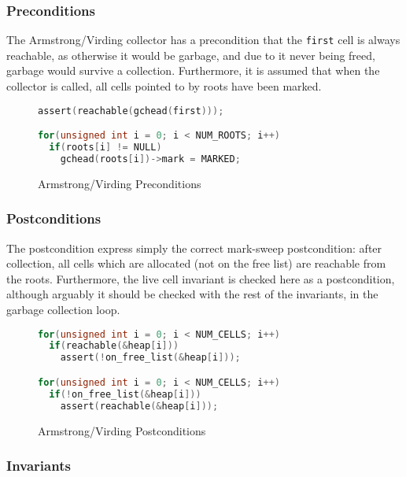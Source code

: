 \subsubsection{Preconditions}
\label{sec:results-impl-ms-pre}

The Armstrong/Virding collector has a precondition that the
\texttt{first} cell is always reachable, as otherwise it would be
garbage, and due to it never being freed, garbage would survive a
collection. Furthermore, it is assumed that when the collector is
called, all cells pointed to by roots have been marked.

\begin{figure}[H]
  \begin{lstlisting}[language=C]
assert(reachable(gchead(first)));

for(unsigned int i = 0; i < NUM_ROOTS; i++)
  if(roots[i] != NULL)
    gchead(roots[i])->mark = MARKED;
  \end{lstlisting}
  \captionsetup{format=default}
  \caption{Armstrong/Virding Preconditions}
\end{figure}

\subsubsection{Postconditions}
\label{sec:results-impl-ms-post}

The postcondition express simply the correct mark-sweep postcondition:
after collection, all cells which are allocated (not on the free list)
are reachable from the roots. Furthermore, the live cell invariant is
checked here as a postcondition, although arguably it should be
checked with the rest of the invariants, in the garbage collection
loop.

\begin{figure}[H]
  \begin{lstlisting}[language=C]
for(unsigned int i = 0; i < NUM_CELLS; i++)
  if(reachable(&heap[i]))
    assert(!on_free_list(&heap[i]));

for(unsigned int i = 0; i < NUM_CELLS; i++)
  if(!on_free_list(&heap[i]))
    assert(reachable(&heap[i]));
  \end{lstlisting}
  \captionsetup{format=default}
  \caption{Armstrong/Virding Postconditions}
\end{figure}

\subsubsection{Invariants}
\label{sec:results-impl-ms-invariants}

